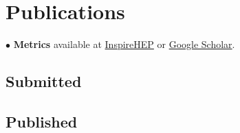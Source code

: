\documentclass[11pt,letterpaper,sans,unicode]{moderncv}
\begin{document}

\section{Publications}



$\bullet$ \textbf{Metrics} available at {\color{color1} \href{https://inspirehep.net/literature?sort=mostrecent&size=25&page=1&q=a%20J.S.Hazboun.1&ui-citation-summary=true}{InspireHEP} or \href{https://scholar.google.com/citations?user=CbNY_MYAAAAJ&hl=en}{Google Scholar}}.

\subsection{Submitted}

\begin{etaremune}[leftmargin=8mm]

\end{etaremune}


%

\subsection{Published}

\begin{etaremune}[leftmargin=8mm]

\end{etaremune}
\end{document}
